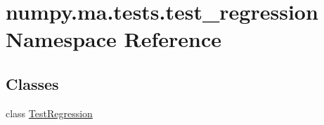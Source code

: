\hypertarget{namespacenumpy_1_1ma_1_1tests_1_1test__regression}{}\section{numpy.\+ma.\+tests.\+test\+\_\+regression Namespace Reference}
\label{namespacenumpy_1_1ma_1_1tests_1_1test__regression}
\subsection*{Classes}
\begin{DoxyCompactItemize}
\item 
class \hyperlink{classnumpy_1_1ma_1_1tests_1_1test__regression_1_1TestRegression}{Test\+Regression}
\end{DoxyCompactItemize}
